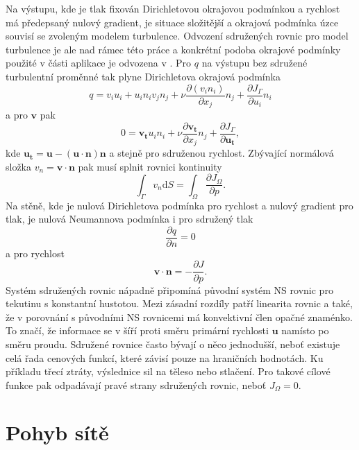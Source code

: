 Na výstupu, kde je tlak fixován Dirichletovou okrajovou podmínkou a rychlost má předepsaný nulový gradient, je situace složitější a okrajová podmínka úzce souvisí se zvoleným modelem turbulence. Odvození sdružených rovnic pro model turbulence je ale nad rámec této práce a konkrétní podoba okrajové podmínky použité v části aplikace je odvozena v \cite{zymaris2009continuous}. Pro $ q $ na výstupu bez sdružené turbulentní proměnné tak plyne Dirichletova okrajová podmínka
\begin{equation}
q = v_i u_i + u_i n_i v_j n_j + \nu \frac{\partial (v_in_i)}{\partial x_j}n_j+\frac{\partial J_\Gamma}{\partial u_i} n_i
\end{equation}
a pro $ \mathbf{v} $ pak
\begin{equation}
0=\mathbf{v_t}u_in_i+\nu\frac{\partial \mathbf{v_t}}{\partial x_j}n_j + \frac{\partial J_\Gamma}{\partial \mathbf{u_t}},
\end{equation}
kde $ \mathbf{u_t}=\mathbf{u}-(\mathbf{u\cdot n})\mathbf{n} $ a stejně pro sdruženou rychlost. Zbývající normálová složka $ v_n=\mathbf{v}\cdot\mathbf{n} $ pak musí splnit rovnici kontinuity
\begin{equation}
\int_{\Gamma}v_n\mathrm{d}S=\int_{\Omega}\frac{\partial J_\Omega}{\partial p}.
\end{equation}
Na stěně, kde je nulová Dirichletova podmínka pro rychlost a nulový gradient pro tlak, je nulová Neumannova podmínka i pro sdružený tlak
\begin{equation}
\frac{\partial q}{\partial n}=0
\end{equation} 
a pro rychlost
\begin{equation}
\mathbf{v} \cdot \mathbf{n}=-\dfrac{\partial J}{\partial p}.
\end{equation}
Systém sdružených rovnic nápadně připomíná původní systém NS rovnic pro tekutinu s konstantní hustotou. Mezi zásadní rozdíly patří linearita rovnic a také, že v porovnání s původními NS rovnicemi má konvektivní člen opačné znaménko. To značí, že informace se v šíří proti směru primární rychlosti $ \mathbf{u} $ namísto po směru proudu. Sdružené rovnice často bývají o něco jednodušší, neboť existuje celá řada cenových funkcí, které závisí pouze na hraničních hodnotách. Ku příkladu třecí ztráty, výslednice sil na těleso nebo stlačení. Pro takové cílové funkce pak odpadávají pravé strany sdružených rovnic, neboť $ J_\Omega = 0 $.


\section{Pohyb sítě}

